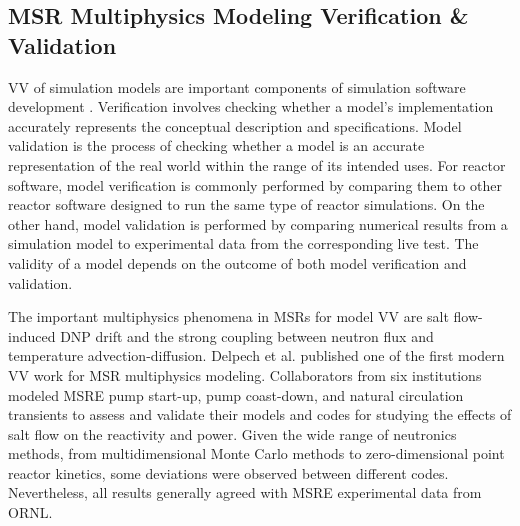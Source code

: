 \subsection{MSR Multiphysics Modeling Verification \& Validation}

\Gls{VV} of simulation models are important components of simulation software development
\cite{sargent_verification_2010}. Verification involves checking whether a model's implementation
accurately represents the conceptual description and specifications. Model
validation is the process of checking whether a model is an accurate representation of the real
world within the range of its intended uses. For reactor software, model verification is commonly
performed by comparing them to other reactor software designed to run the same type of reactor
simulations. On the other hand, model validation is performed by comparing numerical results from
a simulation model to experimental data from the corresponding live test. The validity of a model
depends on the outcome of both model verification and validation.

The important multiphysics phenomena in \glspl{MSR} for model \gls{VV} are salt flow-induced
\gls{DNP} drift and the strong coupling between neutron flux and temperature advection-diffusion.
Delpech et al. \cite{delpech_benchmark_2003}
published one of the first modern \gls{VV} work for \gls{MSR} multiphysics modeling. Collaborators
from six institutions modeled \gls{MSRE} pump start-up, pump coast-down, and natural
circulation transients to assess and validate their models and codes for studying the effects of
salt flow on the reactivity and power. Given the wide range of neutronics methods, from
multidimensional Monte Carlo methods to zero-dimensional point reactor kinetics, some deviations
were observed between different codes. Nevertheless, all results generally agreed
with \gls{MSRE} experimental data from \gls{ORNL}.


